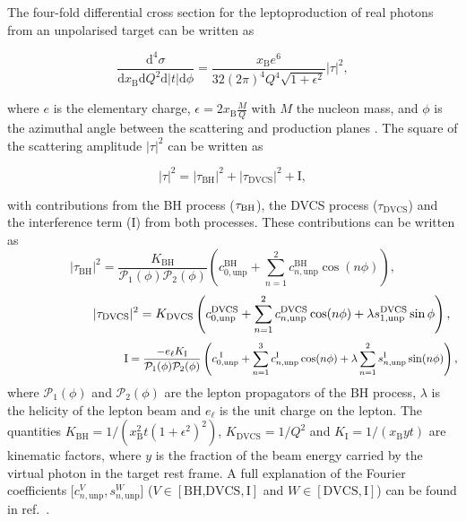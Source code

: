 The four-fold differential cross section for the leptoproduction of real photons
from an unpolarised target can be written as \cite{Bel02b}
\begin{center}
\begin{equation}
\frac{\textrm{d}^4\sigma}{\textrm{d}x_{\textrm{B}}\textrm{d}Q^{2}\textrm{d}
|t|\textrm{d}\phi} =
\frac{x_{\textrm{B}}e^{6}}{32(2\pi)^{4} Q^{4}\sqrt{1+\epsilon^{2}}}
|\tau|^{2},
\end{equation}
\end{center}
where $e$ is the elementary
charge, $\epsilon=2x_\textrm{B}\frac{M}{Q}$ with $M$
the nucleon mass, and $\phi$ is the
azimuthal angle between the scattering and production planes \cite{Tre04}.
The {square of the} scattering amplitude $|\tau|^2$ can be written as
\begin{center}
\begin{equation}
|\tau|^{2} = |\tau_{\textrm{BH}}|^{2} +
|\tau_{\textrm{DVCS}}|^{2} + \textrm{I},
\end{equation}
\end{center}
with contributions from the \textrm{BH} process ($\tau_{\textrm{\textrm{BH}}}$),
the DVCS process
($\tau_{\textrm{DVCS}}$) and the interference term (I) from both processes. These
contributions can be written as
\begin{equation}
 |\tau_{\textrm{BH}}|^{2} =
\frac{K_{\textrm{BH}}}{\mathcal{P}_{1}(\phi)\mathcal{P}_{2}(\phi)}
\left(c_{0,\textrm{unp}}^{
\textrm{BH}} + \sum_{n=1}^2 c_{n,\textrm{unp}}^{\textrm{BH}}\cos(n\phi)\right),
\label{e:tbh}
\end{equation}
\begin{equation}
 \hspace{2.2cm}|\tau_{\textrm{DVCS}}|^{2} =
K_{\textrm{DVCS}}\left(c_{0,\textrm{unp}}^{\textrm{DVCS}} +
\sum_{n=1}^2
c_{n,\textrm{unp}}^{\textrm{DVCS}}\cos(n\phi) + \lambda
s_{1,\textrm{unp}}^{\textrm{DVCS}}\sin\phi\right),
\label{e:tdvcs}
\end{equation}
\begin{equation}
\hspace{3.7cm} \textrm{I} = \frac{- e_\ell
K_{\textrm{I}}}{\mathcal{P}_{1}(\phi)\mathcal{P}_{2}(\phi)}\left(c_{0,\textrm{unp}}^{\textrm{
I}}
+
\sum_{n=1}^3 c_{n,\textrm{unp}}^{\textrm{I}}\cos(n\phi) + \lambda \sum_{n=1}^2
s_{n,\textrm{unp}}^{\textrm{I}}\sin(n\phi)\right),
\label{e:ti}
\end{equation}
where $\mathcal{P}_1(\phi)$ and $\mathcal{P}_2(\phi)$ are the lepton propagators
of the BH process, $\lambda$ is the
helicity of the lepton beam and $e_\ell$ is the unit charge on
  the lepton.  The
quantities $K_{\textrm{BH}}=1/(x_\textrm{B}^2t(1+\epsilon^2)^2)$,
$K_{\textrm{DVCS}}=1/Q^2$
and $K_{\textrm{I}}=1/(x_{\textrm{B}}yt)$ are kinematic factors, where
$y$ is the fraction of the beam energy carried by the virtual photon in
the target rest frame. A full
explanation of the Fourier coefficients [$c_{n,\textrm{unp}}^V,s_{n,\textrm{unp}}^W$]
($V\in[\textrm{BH,DVCS},\textrm{I}]$ and $W\in[\textrm{DVCS},\textrm{I}]$) can be found in ref.~\cite{Bel02b}.
 
